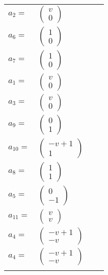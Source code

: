 \documentclass[1p]{elsarticle_modified}
\theoremstyle{definition}
\begin{document}
\begin{tabular}{m{7pt} m{180pt} m{7pt} m{180pt} }
\flushright $a_{2}=$&$\begin{pmatrix}v\\0\end{pmatrix}$ \\
\flushright $a_{6}=$&$\begin{pmatrix}1\\0\end{pmatrix}$ \\
\flushright $a_{7}=$&$\begin{pmatrix}1\\0\end{pmatrix}$ \\
\flushright $a_{1}=$&$\begin{pmatrix}v\\0\end{pmatrix}$ \\
\flushright $a_{3}=$&$\begin{pmatrix}v\\0\end{pmatrix}$ \\
\flushright $a_{9}=$&$\begin{pmatrix}0\\1\end{pmatrix}$ \\
\flushright $a_{10}=$&$\begin{pmatrix}- v+1\\1\end{pmatrix}$ \\
\flushright $a_{8}=$&$\begin{pmatrix}1\\1\end{pmatrix}$ \\
\flushright $a_{5}=$&$\begin{pmatrix}0\\-1\end{pmatrix}$ \\
\flushright $a_{11}=$&$\begin{pmatrix}v\\v\end{pmatrix}$ \\
\flushright $a_{4}=$&$\begin{pmatrix}- v+1\\- v\end{pmatrix}$\\ \flushright $a_{4}=$&$\begin{pmatrix}- v+1\\- v\end{pmatrix}$\\&\end{tabular}
\end{document}
